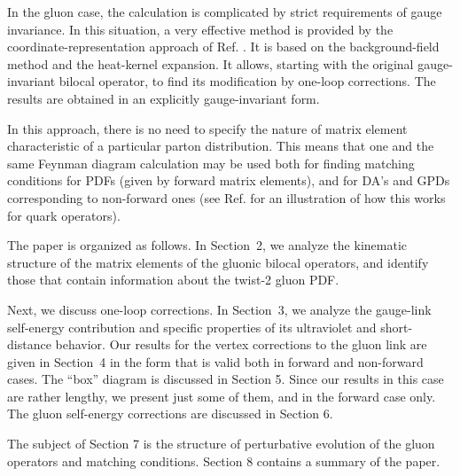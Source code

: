 In the gluon case, the calculation is complicated by
strict requirements of gauge invariance. In this situation,
a very effective method is provided by the coordinate-representation approach of
Ref. \cite{Balitsky:1987bk}. It is based on the background-field method
and the heat-kernel expansion. It allows, starting with the original gauge-invariant
bilocal operator, to find its modification by one-loop corrections.
The results are obtained in an explicitly gauge-invariant form.

In this approach, there is no need
to specify the nature of matrix element characteristic of a particular
parton distribution. This means that one and the same Feynman diagram
calculation may be used both for finding
matching conditions for PDFs (given by forward matrix elements),
and for DA's and GPDs corresponding to non-forward ones (see Ref. \cite{Radyushkin:2019owq}
for an illustration of how this works for quark operators).

The paper is organized as follows.
In
\mbox{Section 2}, we analyze the kinematic structure of the matrix elements of the gluonic bilocal operators,
and identify those that contain information about the twist-2 gluon PDF.

Next, we discuss one-loop corrections. In \mbox{Section 3,} we analyze the gauge-link self-energy contribution
and specific properties of its ultraviolet and short-distance behavior.
Our results for the vertex corrections to the gluon link are given in \mbox{Section 4}
in the form that is valid both in forward and non-forward cases.
The ``box'' diagram is discussed in Section 5.
Since our results in this case are rather lengthy,
we present just some of them, and in the forward case only.
The gluon self-energy corrections are discussed in Section 6.

The subject of Section 7 is the structure of perturbative evolution
of the gluon operators and matching conditions.
Section 8 contains a summary of the paper.
